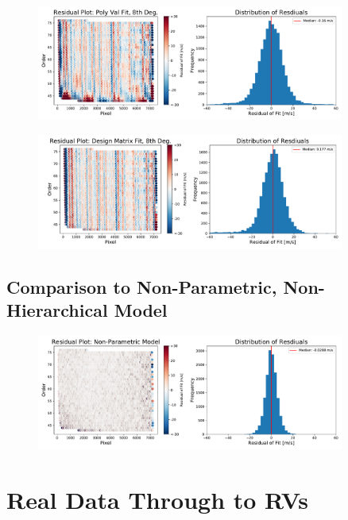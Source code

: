 \documentclass[12pt, letterpaper]{article}
\begin{document}
\begin{figure}[h]
\centering
\includegraphics[width=0.9\textwidth]{Figures/polyval2d.pdf}
\caption{}
\label{fig:polyValFit}
\end{figure} 

\begin{figure}[h]
\centering
\includegraphics[width=0.9\textwidth]{Figures/designMatrix.pdf}
\caption{}
\label{fig:dsnMFit}
\end{figure} 

\subsection{Comparison to Non-Parametric, Non-Hierarchical Model}

\begin{figure}[h]
\centering
\includegraphics[width=0.9\textwidth]{Figures/noHierc.pdf}
\caption{}
\label{fig:intpFit}
\end{figure} 

\section{Real Data Through to RVs} \label{sec:realdata}
\end{document}
